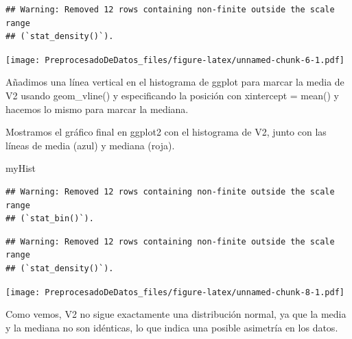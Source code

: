 \documentclass[
]{article}
\newenvironment{Shaded}{\begin{snugshade}}{\end{snugshade}}
\newcommand{\AttributeTok}[1]{\textcolor[rgb]{0.13,0.29,0.53}{#1}}
\newcommand{\ConstantTok}[1]{\textcolor[rgb]{0.56,0.35,0.01}{#1}}
\newcommand{\FunctionTok}[1]{\textcolor[rgb]{0.13,0.29,0.53}{\textbf{#1}}}
\newcommand{\NormalTok}[1]{#1}
\newcommand{\OtherTok}[1]{\textcolor[rgb]{0.56,0.35,0.01}{#1}}
\newcommand{\SpecialCharTok}[1]{\textcolor[rgb]{0.81,0.36,0.00}{\textbf{#1}}}
\newcommand{\StringTok}[1]{\textcolor[rgb]{0.31,0.60,0.02}{#1}}
\begin{document}
\begin{verbatim}
## Warning: Removed 12 rows containing non-finite outside the scale range
## (`stat_density()`).
\end{verbatim}

\texttt{[image: PreprocesadoDeDatos\_files/figure-latex/unnamed-chunk-6-1.pdf]}

Añadimos una línea vertical en el histograma de ggplot para marcar la
media de V2 usando geom\_vline() y especificando la posición con
xintercept = mean() y hacemos lo mismo para marcar la mediana.

\begin{Shaded}
\end{Shaded}

Mostramos el gráfico final en ggplot2 con el histograma de V2, junto con
las líneas de media (azul) y mediana (roja).

\begin{Shaded}
\begin{Highlighting}[]
\NormalTok{myHist}
\end{Highlighting}
\end{Shaded}

\begin{verbatim}
## Warning: Removed 12 rows containing non-finite outside the scale range
## (`stat_bin()`).
\end{verbatim}

\begin{verbatim}
## Warning: Removed 12 rows containing non-finite outside the scale range
## (`stat_density()`).
\end{verbatim}

\texttt{[image: PreprocesadoDeDatos\_files/figure-latex/unnamed-chunk-8-1.pdf]}

Como vemos, V2 no sigue exactamente una distribución normal, ya que la
media y la mediana no son idénticas, lo que indica una posible asimetría
en los datos.
\end{document}
